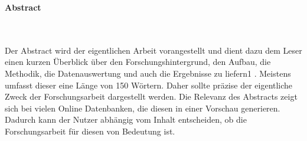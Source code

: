 %
%
%

\thispagestyle{empty}

\begin{adjustwidth}{-2cm}{}






\begin{Huge}\textbf{
\newline
\newline
\newline
\newline
\newline %
Abstract}\end{Huge} \\ \\

Der Abstract wird der eigentlichen Arbeit vorangestellt und dient dazu dem Leser einen kurzen
Überblick über den Forschungshintergrund, den Aufbau, die Methodik, die Datenauswertung und auch
die Ergebnisse zu liefern1
. Meistens umfasst dieser eine Länge von 150 Wörtern. Daher sollte präzise
der eigentliche Zweck der Forschungsarbeit dargestellt werden. Die Relevanz des Abstracts zeigt sich
bei vielen Online Datenbanken, die diesen in einer Vorschau generieren. Dadurch kann der Nutzer
abhängig vom Inhalt entscheiden, ob die Forschungsarbeit für diesen von Bedeutung ist.







\end{adjustwidth}

